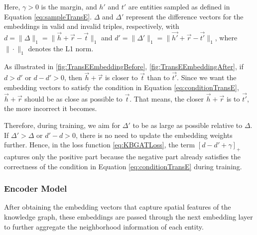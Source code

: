 Here, $\gamma > 0$ is the margin, and $h'$ and $t'$ are entities sampled as defined in Equation \ref{eq:sampleTransE}. $\Delta$ and $\Delta'$ represent the difference vectors for the embeddings in valid and invalid triples, respectively, with $d = \big\|\Delta \big\|_{1} = \big\| \overrightarrow{h} + \overrightarrow{r} - \overrightarrow{t} \big\|_{1}$ and $d' = \big\|\Delta' \big\|_{1} = \big\| \overrightarrow{h'} + \overrightarrow{r} - \overrightarrow{t'} \big\|_{1}$, where $\|\cdot\|_{1}$ denotes the L1 norm.

As illustrated in \autoref{fig:TransEEmbeddingBefore}, \autoref{fig:TransEEmbeddingAfter}, if $d > d'$ or $d - d' > 0$, then $\overrightarrow{h} + \overrightarrow{r}$ is closer to $\overrightarrow{t}$ than to $\overrightarrow{t'}$. Since we want the embedding vectors to satisfy the condition in Equation \ref{eq:conditionTransE}, $\overrightarrow{h} + \overrightarrow{r}$ should be as close as possible to $\overrightarrow{t}$. That means, the closer $\overrightarrow{h} + \overrightarrow{r}$ is to $\overrightarrow{t'}$, the more incorrect it becomes.

Therefore, during training, we aim for $\Delta'$ to be as large as possible relative to $\Delta$. If $\Delta' > \Delta$ or $d' - d > 0$, there is no need to update the embedding weights further. Hence, in the loss function \ref{eq:KBGATLoss}, the term $[d - d' + \gamma]_{+}$ captures only the positive part because the negative part already satisfies the correctness of the condition in Equation \ref{eq:conditionTransE} during training.



\subsubsection{Encoder Model}
\label{sec:encodeKBGAT}

After obtaining the embedding vectors that capture spatial features of the knowledge graph, these embeddings are passed through the next embedding layer to further aggregate the neighborhood information of each entity.


